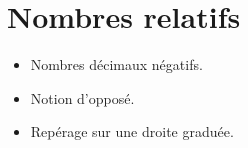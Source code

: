 \themaN
\graphicspath{{../../S04_Nombres_relatifs/Images/}}

\chapter{Nombres relatifs}
\label{S04}

\begin{prerequis}
   \begin{itemize}
      \item Nombres décimaux négatifs.
      \item Notion d'opposé.
      \item[\com] Repérage sur une droite graduée.
   \end{itemize}
\end{prerequis}

\vfill

\def\thermo{\pspolygon[linearc=0.1,fillstyle=solid](-0.1,6.8)(-0.1,0.6)(-0.2,0.4)(-0.2,-0.1)(0.2,-0.1)(0.2,0.4)(0.1,0.6)(0.1,6.8) \pspolygon[linecolor=B1, linearc=0.1, fillstyle=solid, fillcolor=B1](0,5)(0,0.5)(-0.1,0.3)(-0.1,0)(0.1,0)(0.1,0.3)(0,0.5) \pscircle(0,6.7){0.05}}
            
